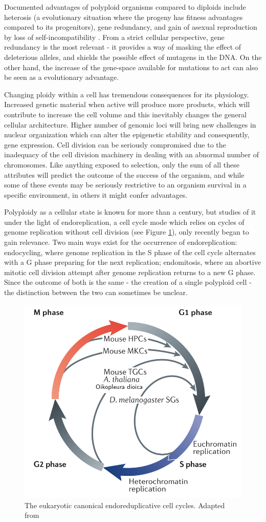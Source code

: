 \documentclass[11pt,twoside,a4paper]{report}
\begin{document}
		Documented advantages of polyploid organisms compared to diploids include heterosis (a evolutionary situation where the progeny has fitness advantages compared to its progenitors), gene redundancy, and gain of asexual reproduction by loss of self-incompatibility \cite{Comai2005}. From a strict cellular perspective, gene redundancy is the most relevant - it provides a way of masking the effect of deleterious alleles, and shields the possible effect of mutagens in the DNA. On the other hand, the increase of the gene-space available for mutations to act can also be seen as a evolutionary advantage.
		
		Changing ploidy within a cell has tremendous consequences for its physiology. Increased genetic material when active will produce more products, which will contribute to increase the cell volume and this inevitably changes the general cellular architecture. Higher number of genomic loci will bring new challenges in nuclear organization which can alter the epigenetic stability and consequently, gene expression. Cell division can be seriously compromised due to the inadequacy of the cell division machinery in dealing with an abnormal number of chromosomes. Like anything exposed to selection, only the sum of all these attributes will predict the outcome of the success of the organism, and while some of these events may be seriously restrictive to an organism survival in a specific environment, in others it might confer advantages.
		
		Polyploidy as a cellular state is known for more than a century, but studies of it under the light of endoreplication, a cell cycle mode which relies on cycles of genome replication without cell division (see Figure \ref{fig:simple_cell_cycle}), only recently began to gain relevance. Two main ways exist for the occurrence of endoreplication: endocycling, where genome replication in the S phase of the cell cycle alternates with a G phase preparing for the next replication; endomitosis, where an abortive mitotic cell division attempt after genome replication returns to a new G phase. Since the outcome of both is the same - the creation of a single polyploid cell - the distinction between the two can sometimes be unclear.
		
		\begin{figure}[here]
			\centering
			\includegraphics[width=0.6 \textwidth]{pngs/simple_cell_cycle.png}
			\caption{The eukaryotic canonical endoreduplicative cell cycles. {\footnotesize Adapted from \cite{Frisch2002}}}
			\label{fig:simple_cell_cycle}
		\end{figure}
		
\end{document}
